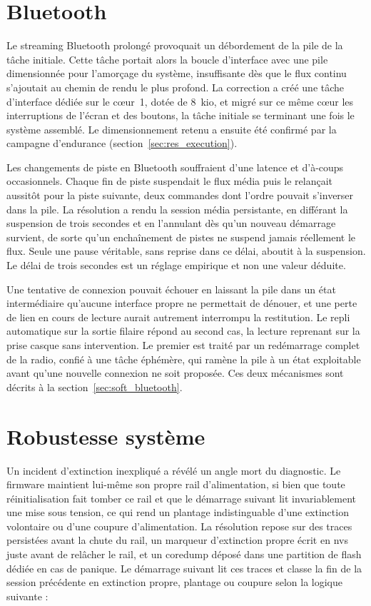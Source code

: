 \section{Bluetooth}

Le streaming Bluetooth prolongé provoquait un débordement de la pile de la tâche initiale. Cette tâche portait alors la boucle d'interface avec une pile dimensionnée pour l'amorçage du système, insuffisante dès que le flux continu s'ajoutait au chemin de rendu le plus profond. La correction a créé une tâche d'interface dédiée sur le cœur~1, dotée de 8~kio, et migré sur ce même cœur les interruptions de l'écran et des boutons, la tâche initiale se terminant une fois le système assemblé. Le dimensionnement retenu a ensuite été confirmé par la campagne d'endurance (section~\ref{sec:res_execution}).

Les changements de piste en Bluetooth souffraient d'une latence et d'à-coups occasionnels. Chaque fin de piste suspendait le flux média puis le relançait aussitôt pour la piste suivante, deux commandes dont l'ordre pouvait s'inverser dans la pile. La résolution a rendu la session média persistante, en différant la suspension de trois secondes et en l'annulant dès qu'un nouveau démarrage survient, de sorte qu'un enchaînement de pistes ne suspend jamais réellement le flux. Seule une pause véritable, sans reprise dans ce délai, aboutit à la suspension. Le délai de trois secondes est un réglage empirique et non une valeur déduite.

Une tentative de connexion pouvait échouer en laissant la pile dans un état intermédiaire qu'aucune interface propre ne permettait de dénouer, et une perte de lien en cours de lecture aurait autrement interrompu la restitution. Le repli automatique sur la sortie filaire répond au second cas, la lecture reprenant sur la prise casque sans intervention. Le premier est traité par un redémarrage complet de la radio, confié à une tâche éphémère, qui ramène la pile à un état exploitable avant qu'une nouvelle connexion ne soit proposée. Ces deux mécanismes sont décrits à la section~\ref{sec:soft_bluetooth}.

\section{Robustesse système}

Un incident d'extinction inexpliqué a révélé un angle mort du diagnostic. Le firmware maintient lui-même son propre rail d'alimentation, si bien que toute réinitialisation fait tomber ce rail et que le démarrage suivant lit invariablement une mise sous tension, ce qui rend un plantage indistinguable d'une extinction volontaire ou d'une coupure d'alimentation. La résolution repose sur des traces persistées avant la chute du rail, un marqueur d'extinction propre écrit en \gls{nvs} juste avant de relâcher le rail, et un coredump déposé dans une partition de flash dédiée en cas de panique. Le démarrage suivant lit ces traces et classe la fin de la session précédente en extinction propre, plantage ou coupure selon la logique suivante :

